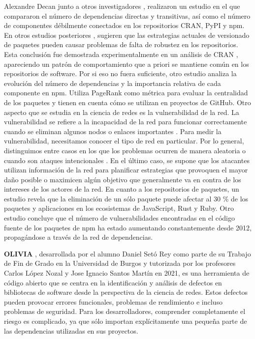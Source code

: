 Alexandre Decan junto a otros investigadores \cite{10.1145/2993412.3003382}, realizaron un estudio en el que compararon el número de dependencias
directas y transitivas, así como el número de componentes débilmente conectados en los repositorios CRAN, PyPI y npm.
En otros estudios posteriores \cite{10.1109/SANER.2017.7884604}, sugieren que las estrategias actuales de versionado de paquetes
pueden causar problemas de falta de robustez en los repositorios. Esta conclusión fue demostrada experimentalmente en un análisis de
CRAN \cite{10.1109/SANER.2016.12}, apareciendo un patrón de comportamiento que a priori se mantiene común en los repositorios de software.
Por si eso no fuera suficiente, otro estudio \cite{10.1145/2901739.2901743} analiza la evolución del número de dependencias y la importancia
relativa de cada componente en npm. Utiliza PageRank como métrica para evaluar la centralidad de los paquetes y tienen en cuenta cómo
se utilizan en proyectos de GitHub.
Otro aspecto que se estudia en la ciencia de redes es la vulnerabilidad de la red. La vulnerabilidad se refiere a la incapacidad de la
red para funcionar correctamente cuando se eliminan algunos nodos o enlaces importantes \cite{posfai2016network}. Para medir la vulnerabilidad,
necesitamos conocer el tipo de red en particular. Por lo general, distinguimos entre casos en los que los problemas ocurren de manera aleatoria
o cuando son ataques intencionales \cite{Albert2000}. En el último caso, se supone que los atacantes utilizan información de la red para
planificar estrategias que provoquen el mayor daño posible o maximicen algún objetivo que generalmente va en contra de los intereses de los
actores de la red.
En cuanto a los repositorios de paquetes, un estudio \cite{10.1145/2901739.2901743} revela que la eliminación de un sólo paquete puede
afectar al 30 \% de los paquetes y aplicaciones en los ecosistemas de JavaScript, Rust y Ruby.
Otro estudio \cite{10.1145/3196398.3196401} concluye que el número de vulnerabilidades encontradas en el código fuente de los paquetes
de npm ha estado aumentando constantemente desde 2012, propagándose a través de la red de dependencias.

\textbf{OLIVIA} \cite{daniel_2022_7358391}, desarrollada por el alumno Daniel Setó Rey como parte de su Trabajo de Fin de Grado en la 
Universidad de Burgos y tutorizada por los profesores Carlos López Nozal y Jose Ignacio Santos Martín en 2021, es una herramienta de 
código abierto que se centra en la identificación y análisis de defectos en bibliotecas de software desde la perspectiva de la ciencia 
de redes. Estos defectos pueden provocar errores funcionales, problemas de rendimiento e incluso problemas de seguridad. Para los 
desarrolladores, comprender completamente el riesgo es complicado, ya que sólo importan explícitamente una pequeña parte de las dependencias utilizadas en sus proyectos.


